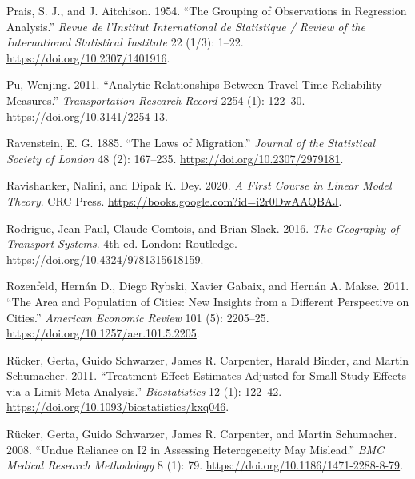 \documentclass[
  11pt,
  openany]{memoir}
\newlength{\cslhangindent}
\newlength{\cslentryspacingunit} %
\newenvironment{CSLReferences}[2] %
 {%
  \setlength{\parindent}{0pt}
  \ifodd #1
  \let\oldpar\par
  \def\par{\hangindent=\cslhangindent\oldpar}
  \fi
  \setlength{\parskip}{#2\cslentryspacingunit}
 }%
 {}
\begin{document}
\begin{CSLReferences}{1}{0}
\leavevmode{}%
Prais, S. J., and J. Aitchison. 1954. {``The {Grouping} of {Observations} in {Regression Analysis}.''} \emph{Revue de l'Institut International de Statistique / Review of the International Statistical Institute} 22 (1/3): 1--22. \url{https://doi.org/10.2307/1401916}.

\leavevmode{}%
Pu, Wenjing. 2011. {``Analytic {Relationships} Between {Travel Time Reliability Measures}.''} \emph{Transportation Research Record} 2254 (1): 122--30. \url{https://doi.org/10.3141/2254-13}.

\leavevmode{}%
Ravenstein, E. G. 1885. {``The {Laws} of {Migration}.''} \emph{Journal of the Statistical Society of London} 48 (2): 167--235. \url{https://doi.org/10.2307/2979181}.

\leavevmode{}%
Ravishanker, Nalini, and Dipak K. Dey. 2020. \emph{A {First Course} in {Linear Model Theory}}. {CRC Press}. \url{https://books.google.com?id=i2r0DwAAQBAJ}.

\leavevmode{}%
Rodrigue, Jean-Paul, Claude Comtois, and Brian Slack. 2016. \emph{The {Geography} of {Transport Systems}}. 4th ed. {London}: {Routledge}. \url{https://doi.org/10.4324/9781315618159}.

\leavevmode{}%
Rozenfeld, Hernán D., Diego Rybski, Xavier Gabaix, and Hernán A. Makse. 2011. {``The {Area} and {Population} of {Cities}: New {Insights} from a {Different Perspective} on {Cities}.''} \emph{American Economic Review} 101 (5): 2205--25. \url{https://doi.org/10.1257/aer.101.5.2205}.

\leavevmode{}%
Rücker, Gerta, Guido Schwarzer, James R. Carpenter, Harald Binder, and Martin Schumacher. 2011. {``Treatment-Effect Estimates Adjusted for Small-Study Effects via a Limit Meta-Analysis.''} \emph{Biostatistics} 12 (1): 122--42. \url{https://doi.org/10.1093/biostatistics/kxq046}.

\leavevmode{}%
Rücker, Gerta, Guido Schwarzer, James R. Carpenter, and Martin Schumacher. 2008. {``Undue Reliance on {I2} in Assessing Heterogeneity May Mislead.''} \emph{BMC Medical Research Methodology} 8 (1): 79. \url{https://doi.org/10.1186/1471-2288-8-79}.


\end{CSLReferences}
\end{document}
